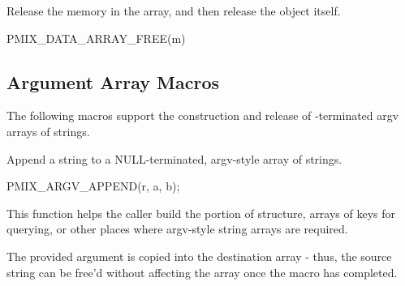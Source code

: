 
Release the memory in the array, and then release the  object itself.

\cspecificstart
\begin{codepar}
PMIX_DATA_ARRAY_FREE(m)
\end{codepar}
\cspecificend

\begin{arglist}
\end{arglist}

\subsection{Argument Array Macros}

The following macros support the construction and release of -terminated argv arrays of strings.


\summary

Append a string to a NULL-terminated, argv-style array of strings.

\cspecificstart
\begin{codepar}
PMIX_ARGV_APPEND(r, a, b);
\end{codepar}
\cspecificend

\begin{arglist}
\end{arglist}

\descr

This function helps the caller build the  portion of  structure, arrays of keys for querying, or other places where argv-style string arrays are required.

\adviceuserstart
The provided argument is copied into the destination array - thus, the source string can be free'd without affecting the array once the macro has completed.
\adviceuserend


